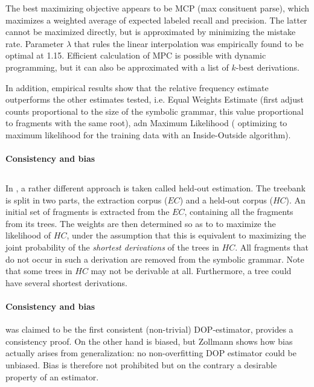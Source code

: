 The best maximizing objective appears to be MCP (max consituent parse), which maximizes a weighted average of expected labeled recall and precision. The latter cannot be maximized directly, but is approximated by minimizing the mistake rate. 
Parameter $\lambda$ that rules the linear interpolation was empirically found to be optimal at 1.15. Efficient calculation of MPC is possible with dynamic programming, but it can also be approximated with a list of $k$-best derivations.

In addition, empirical results show that the relative frequency estimate outperforms the other estimates tested, i.e. Equal Weights Estimate (first adjust counts proportional to the size of the symbolic grammar, this value proportional to fragments with the same root), adn Maximum Likelihood ( optimizing to maximum likelihood for the training data with an Inside-Outside algorithm). 


\paragraph{Consistency and bias}

\subsection{\dops}
In \dops{} \cite{zollmann2005}, a rather different approach is taken called held-out estimation. The treebank is split in two parts, the extraction corpus ($EC$) and a held-out corpus ($HC$). An initial set of fragments is extracted from the $EC$, containing all the fragments from its trees. The weights are then determined so as to to maximize the likelihood of $HC$, under the assumption that this is equivalent to maximizing the joint probability of the \emph{shortest derivations} of the trees in $HC$. All fragments that do not occur in such a derivation are removed from the symbolic grammar. 
Note that some trees in $HC$ may not be derivable at all. Furthermore, a tree could have several shortest derivations. 

\paragraph{Consistency and bias}
\dops{} was claimed to be the first consistent (non-trivial) DOP-estimator, \cite{zollmann2005} provides a consistency proof. On the other hand \dops{} is  biased, but Zollmann shows how bias actually arises from generalization: no non-overfitting DOP estimator could be unbiased. Bias is therefore not prohibited but on the contrary a desirable property of an estimator.


